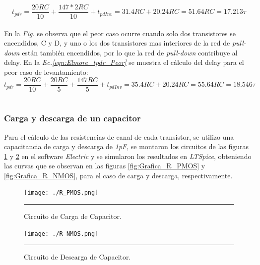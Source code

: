 \documentclass[12pt,a4paper]{article} %
\begin{document}

\begin{equation}\label{eqn:Elmore_tpdr_Mejor}
t_{pdr} = \frac{20RC}{10} + \frac{147*2RC}{10} + t_{pdInv}= 31.4RC + 20.24RC = 51.64RC = 17.213\tau
\end{equation}\\

En la \textit{Fig.} se observa que el peor caso ocurre cuando solo dos transistores se encendidos, C y D, y uno o los dos transistores mas interiores de la red de \textit{pull-down} están también encendidos, por lo que la red de \textit{pull-down} contribuye al delay. En la \textit{Ec.\ref{eqn:Elmore_tpdr_Peor}} se muestra el cálculo del delay para el peor caso de levantamiento:\\

\begin{equation}\label{eqn:Elmore_tpdr_Peor}
t_{pdr} = \frac{20RC}{10}+\frac{20RC}{5}+\frac{147RC}{5}+t_{pdInv}= 35.4RC + 20.24RC = 55.64RC = 18.546\tau
\end{equation}\\








\subsubsection{Carga y descarga de un capacitor}

Para el cálculo de las resistencias de canal de cada transistor, se utilizo una capacitancia de carga y descarga de \textit{1pF}, se montaron los circuitos de las figuras \ref{fig:R_PMOS} y \ref{fig:R_NMOS} en el software \textit{Electric} y se simularon los resultados en  \textit{LTSpice}, obteniendo las curvas que se observan en las figuras \ref{fig:Grafica_R_PMOS} y \ref{fig:Grafica_R_NMOS}, para el caso de carga y descarga, respectivamente.\\

\begin{figure}[htbp]
  \centering
    \texttt{[image: ./R\_PMOS.png]}
    \rule{35em}{0.3pt}
  \caption[C_Carga]{Circuito de Carga de Capacitor.}
  \label{fig:R_PMOS}
\end{figure}

\begin{figure}[htbp]
  \centering
  	\texttt{[image: ./R\_NMOS.png]}
    \rule{35em}{0.3pt}
  \caption[C_Descarga]{Circuito de Descarga de Capacitor.}
  \label{fig:R_NMOS}
\end{figure}
\end{document}
